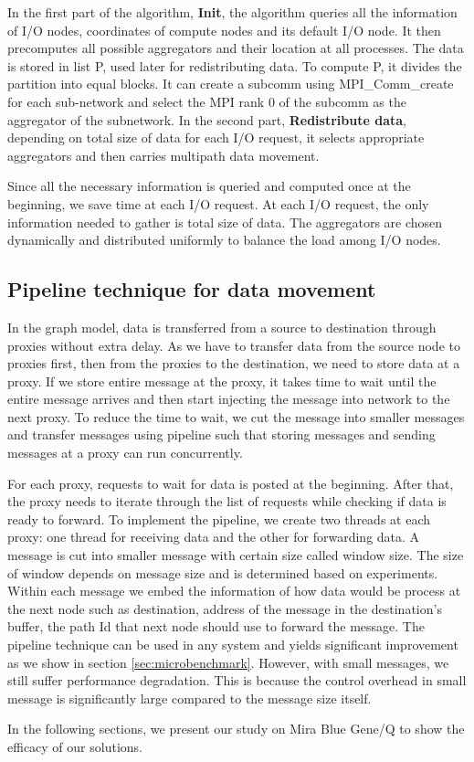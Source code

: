 In the first part of the algorithm, \textbf{Init}, the algorithm queries all the information of I/O nodes, coordinates of compute nodes and its default I/O node. It then precomputes all possible aggregators and their location at all processes. The data is stored in list P, used later for redistributing data. To compute P, it divides the partition into equal blocks. It can create a subcomm using MPI\_Comm\_create for each sub-network and select the MPI rank 0 of the subcomm as the aggregator of the subnetwork. In the second part, \textbf{Redistribute data}, depending on total size of data for each I/O request, it selects appropriate aggregators and then carries multipath data movement.

Since all the necessary information is queried and computed once at the beginning, we save time at each I/O request. At each I/O request, the only information needed to gather is total size of data. The aggregators are chosen dynamically and distributed uniformly to balance the load among I/O nodes.

\subsection{Pipeline technique for data movement}
In the graph model, data is transferred from a source to destination through proxies without extra delay. As we have to transfer data from the source node to proxies first, then from the proxies to the destination, we need to store data at a proxy. If we store entire message at the proxy, it takes time to wait until the entire message arrives and  then start injecting the message into network to the next proxy. To reduce the time to wait, we cut the message into smaller messages and transfer messages using pipeline such that storing messages and sending messages at a proxy can run concurrently. %


For each proxy, requests to wait for data is posted at the beginning. After that, the proxy needs to iterate through the list of requests while checking if data is ready to forward. To implement the pipeline, we create two threads at each proxy: one thread for receiving data and the other for forwarding data. A message is cut into smaller message with certain size called window size. The size of window depends on message size and is determined based on experiments. Within each message we embed the information of how data would be process at the next node such as destination, address of the message in the destination's buffer, the path Id that next node should use to forward the message. The pipeline technique can be used in any system and yields significant improvement as we show in section \ref{sec:microbenchmark}. However, with small messages, we still suffer performance degradation. This is because the control overhead in small message is significantly large compared to the message size itself.

In the following sections, we present our study on Mira Blue Gene/Q to show the efficacy of our solutions.